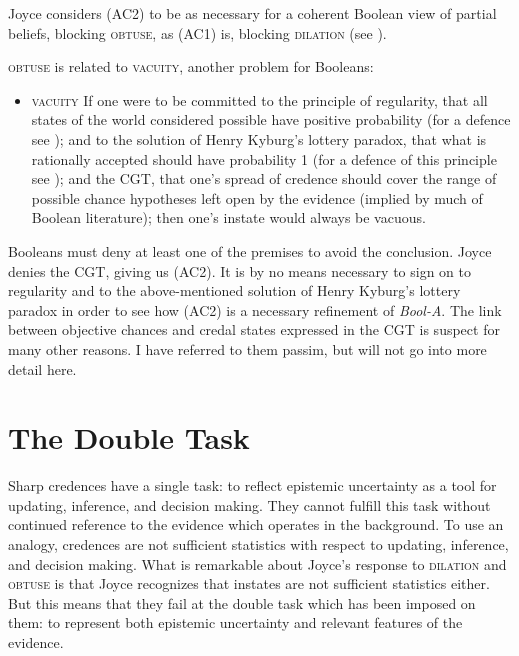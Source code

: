 \documentclass[11pt]{article}
\newcommand{\anderson}[0]{\textit{Bool-A}}
\begin{document}
Joyce considers (AC2) to be as necessary for a coherent Boolean view
of partial beliefs, blocking \textsc{obtuse}, as (AC1) is, blocking
\textsc{dilation} (see ). 

\textsc{obtuse} is related to \textsc{vacuity}, another problem for
Booleans:

\begin{itemize}
\item \textsc{vacuity} If one were to be committed to the principle of
  regularity, that all states of the world considered possible have
  positive probability (for a defence see
  ); and to the solution of Henry
  Kyburg's lottery paradox, that what is rationally accepted should
  have probability 1 (for a defence of this principle see
  ); and the CGT, that one's spread of
  credence should cover the range of possible chance hypotheses left
  open by the evidence (implied by much of Boolean literature); then
  one's instate would always be vacuous.
\end{itemize}

Booleans must deny at least one of the premises to avoid the
conclusion. Joyce denies the CGT, giving us (AC2). It is by no means
necessary to sign on to regularity and to the above-mentioned solution
of Henry Kyburg's lottery paradox in order to see how (AC2) is a
necessary refinement of {\anderson}. The link between objective
chances and credal states expressed in the CGT is suspect for many
other reasons. I have referred to them passim, but will not go into
more detail here.

\section{The Double Task}
\label{TheDoubleTask}

Sharp credences have a single task: to reflect epistemic uncertainty
as a tool for updating, inference, and decision making. They cannot
fulfill this task without continued reference to the evidence which
operates in the background. To use an analogy, credences are not
sufficient statistics with respect to updating, inference, and
decision making. What is remarkable about Joyce's response to
\textsc{dilation} and \textsc{obtuse} is that Joyce recognizes that
instates are not sufficient statistics either. But this means that
they fail at the double task which has been imposed on them: to
represent both epistemic uncertainty and relevant features of the
evidence.
\end{document}
